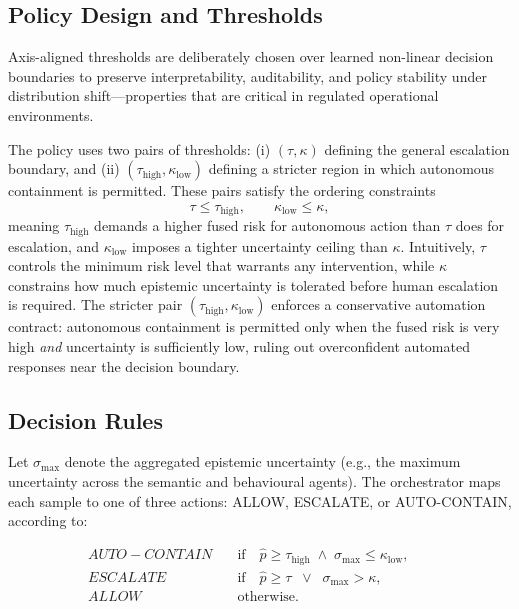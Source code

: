\documentclass[3p]{elsarticle}
\begin{document}
\subsection{Policy Design and Thresholds}
\label{subsec:policy_thresholds}
Axis-aligned thresholds are deliberately chosen over learned non-linear decision boundaries to preserve interpretability, auditability, and policy stability under distribution shift—properties that are critical in regulated operational environments.

The policy uses two pairs of thresholds:
(i) $(\tau,\kappa)$ defining the general escalation boundary, and
(ii) $(\tau_{\text{high}},\kappa_{\text{low}})$ defining a stricter region in which
autonomous containment is permitted.
These pairs satisfy the ordering constraints
\begin{equation}
\tau \le \tau_{\text{high}}, \qquad \kappa_{\text{low}} \le \kappa,
\label{eq:threshold_order}
\end{equation}
meaning $\tau_{\text{high}}$ demands a higher fused risk for autonomous action than $\tau$
does for escalation, and $\kappa_{\text{low}}$ imposes a tighter uncertainty ceiling than
$\kappa$. Intuitively, $\tau$ controls the minimum risk level that warrants any intervention,
while $\kappa$ constrains how much epistemic uncertainty is tolerated before human escalation
is required. The stricter pair $(\tau_{\text{high}},\kappa_{\text{low}})$ enforces a
conservative automation contract: autonomous containment is permitted only when the fused
risk is very high \emph{and} uncertainty is sufficiently low, ruling out overconfident
automated responses near the decision boundary.

\subsection{Decision Rules}
\label{subsec:policy_rules}

Let $\sigma_{\max}$ denote the aggregated epistemic uncertainty (e.g., the maximum
uncertainty across the semantic and behavioural agents). The orchestrator maps each
sample to one of three actions: \textsc{ALLOW}, \textsc{ESCALATE}, or
\textsc{AUTO-CONTAIN}, according to:

\begin{align}
AUTO-CONTAIN \quad &\text{if} \quad   \hat{p}\ge \tau_{\text{high}}\;\wedge\;\sigma_{\max}\le \kappa_{\text{low}}, \label{eq:policy_auto} \\
ESCALATE \quad &\text{if} \quad  \hat{p}\ge \tau \;\;\vee\;\; \sigma_{\max} > \kappa, 
\label{eq:policy_escalate}  \\
ALLOW \quad &\text{otherwise}. && \label{eq:policy_allow}
\end{align}
\end{document}
